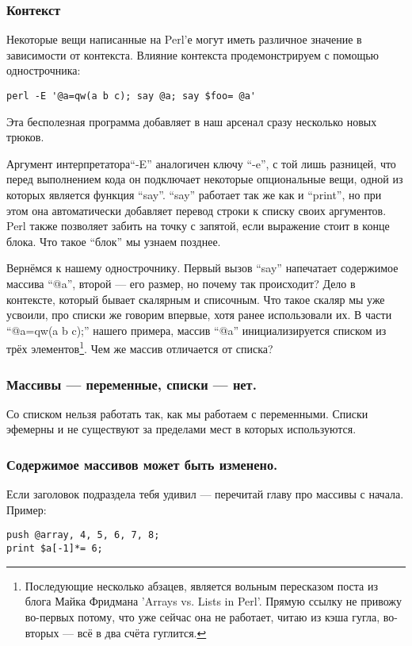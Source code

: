 \subsubsection*{Контекст}

Некоторые вещи написанные на Perl'е могут иметь различное значение в зависимости от контекста. Влияние
контекста продемонстрируем с помощью однострочника:
\begin{verbatim}
perl -E '@a=qw(a b c); say @a; say $foo= @a'
\end{verbatim}
Эта бесполезная программа добавляет в наш арсенал сразу несколько новых трюков.

Аргумент интерпретатора``-E''  аналогичен ключу ``-e'', с той лишь разницей, что перед выполнением кода
он подключает некоторые опциональные вещи, одной из которых является функция ``say''. ``say'' работает
так же как и ``print'', но при этом она автоматически добавляет перевод строки к списку своих аргументов.
Perl также позволяет забить на точку с запятой, если выражение стоит в конце блока. Что такое ``блок'' мы
узнаем позднее.

Вернёмся к нашему однострочнику. Первый вызов ``say'' напечатает содержимое массива ``@a'', второй ---
его размер, но почему так происходит? Дело в контексте, который бывает скалярным и списочным.
Что такое скаляр мы уже усвоили, про списки же говорим впервые, хотя ранее использовали их.
В части ``@a=qw(a b c);'' нашего примера, массив ``@a'' инициализируется списком из трёх
элементов\footnote{Последующие несколько абзацев, является вольным пересказом поста из блога Майка Фридмана 'Arrays vs. Lists in Perl'. Прямую ссылку не привожу во-первых потому, что уже сейчас она не работает,
читаю из кэша гугла, во-вторых --- всё в два счёта гуглится.}. Чем же массив отличается от списка?\newline
\subsubsection*{Массивы --- переменные, списки --- нет.}
Со списком нельзя работать так, как мы работаем с переменными. Списки эфемерны и не существуют за пределами
мест в которых используются.

\subsubsection*{Содержимое массивов может быть изменено.}
Если заголовок подраздела тебя удивил --- перечитай главу про массивы с начала. Пример:
\begin{verbatim}
push @array, 4, 5, 6, 7, 8;
print $a[-1]*= 6;
\end{verbatim}

